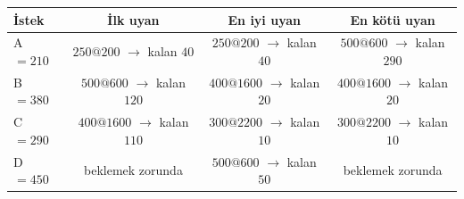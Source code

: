 \begin{tabular}{@{}lccc@{}}
\toprule
\textbf{İstek} & \textbf{İlk uyan} & \textbf{En iyi uyan} & \textbf{En kötü uyan}\\
\midrule
A $= 210$ & $250@200$ $\to$ kalan $40$ & $250@200$ $\to$ kalan $40$ & $500@600$ $\to$ kalan $290$\\
B $= 380$ & $500@600$ $\to$ kalan $120$ & $400@1600$ $\to$ kalan $20$ & $400@1600$ $\to$ kalan $20$\\
C $= 290$ & $400@1600$ $\to$ kalan $110$ & $300@2200$ $\to$ kalan $10$ & $300@2200$ $\to$ kalan $10$\\
D $= 450$ & \textcolor{red!60!black}{beklemek zorunda} & $500@600$ $\to$ kalan $50$ & \textcolor{red!60!black}{beklemek zorunda}\\
\bottomrule
\end{tabular}
